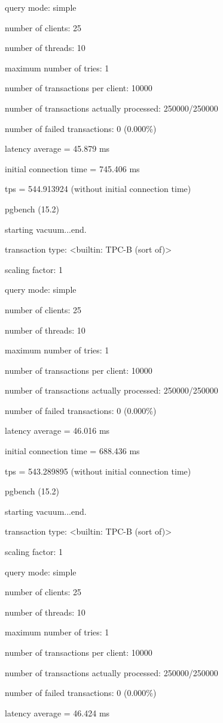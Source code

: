 query mode: simple

number of clients: 25

number of threads: 10

maximum number of tries: 1

number of transactions per client: 10000

number of transactions actually processed: 250000/250000

number of failed transactions: 0 (0.000\%)

latency average = 45.879 ms

initial connection time = 745.406 ms

tps = 544.913924 (without initial connection time)

pgbench (15.2)

starting vacuum...end.

transaction type: <builtin: TPC-B (sort of)>

scaling factor: 1

query mode: simple

number of clients: 25

number of threads: 10

maximum number of tries: 1

number of transactions per client: 10000

number of transactions actually processed: 250000/250000

number of failed transactions: 0 (0.000\%)

latency average = 46.016 ms

initial connection time = 688.436 ms

tps = 543.289895 (without initial connection time)

pgbench (15.2)

starting vacuum...end.

transaction type: <builtin: TPC-B (sort of)>

scaling factor: 1

query mode: simple

number of clients: 25

number of threads: 10

maximum number of tries: 1

number of transactions per client: 10000

number of transactions actually processed: 250000/250000

number of failed transactions: 0 (0.000\%)

latency average = 46.424 ms

